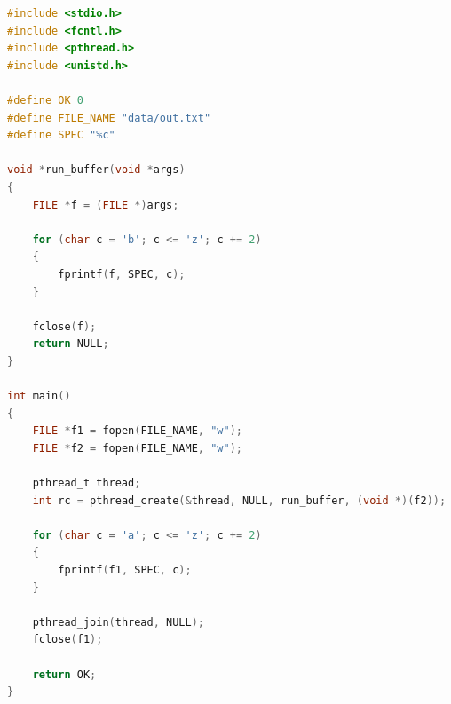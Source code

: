 \documentclass[12pt]{report}
\begin{document}
\begin{lstlisting}[language=c, label=p3thread, caption=Программа №3 (реализация с потоками)]
#include <stdio.h>
#include <fcntl.h>
#include <pthread.h>
#include <unistd.h>

#define OK 0
#define FILE_NAME "data/out.txt"
#define SPEC "%c"

void *run_buffer(void *args)
{
	FILE *f = (FILE *)args;
	
	for (char c = 'b'; c <= 'z'; c += 2)
	{
		fprintf(f, SPEC, c);
	}
	
	fclose(f);
	return NULL;
}

int main()
{
	FILE *f1 = fopen(FILE_NAME, "w");
	FILE *f2 = fopen(FILE_NAME, "w");
	
	pthread_t thread;
	int rc = pthread_create(&thread, NULL, run_buffer, (void *)(f2));
	
	for (char c = 'a'; c <= 'z'; c += 2)
	{
		fprintf(f1, SPEC, c);
	}
	
	pthread_join(thread, NULL);
	fclose(f1);
	
	return OK;
}
\end{lstlisting}

	
\end{document}

